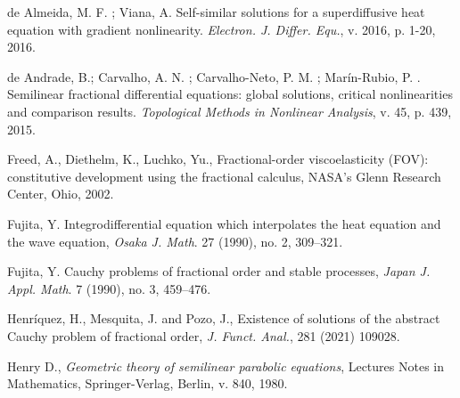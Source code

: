 \documentclass[12pt,reqno]{amsart}
\begin{document}
\begin{thebibliography}{}
				 de Almeida, M. F. ; Viana, A.  Self-similar solutions for a superdiffusive heat equation with gradient nonlinearity. {\it Electron. J. Differ. Equ.}, v. 2016, p. 1-20, 2016.
				
					de Andrade, B.; Carvalho, A. N. ; Carvalho-Neto, P. M. ; Marín-Rubio, P. . Semilinear fractional differential equations: global solutions, critical nonlinearities and comparison results. {\it Topological Methods in Nonlinear Analysis}, v. 45, p. 439, 2015.
				
				
				
				
				
				 Freed, A.,  Diethelm, K., Luchko, Yu., Fractional-order viscoelasticity (FOV): constitutive development using the fractional calculus, NASA’s Glenn Research
				Center, Ohio, 2002.
				
				 Fujita, Y. Integrodifferential equation which interpolates the heat equation and the wave equation, {\it Osaka J. Math}. 27 (1990), no. 2, 309–321.
				
				 Fujita, Y.  Cauchy problems of fractional order and stable processes, {\it Japan J. Appl. Math}. 7 (1990), no. 3, 459–476.
				
				
				 Henríquez, H., Mesquita, J. and Pozo, J., Existence of solutions of the abstract Cauchy problem of fractional order, {\it J. Funct. Anal.}, 281 (2021) 109028.
				
				
				
				 Henry D., {\it Geometric theory of semilinear parabolic equations}, Lectures Notes in Mathematics, Springer-Verlag, Berlin, v. 840, 1980.
				
				

\end{thebibliography}
\end{document}
